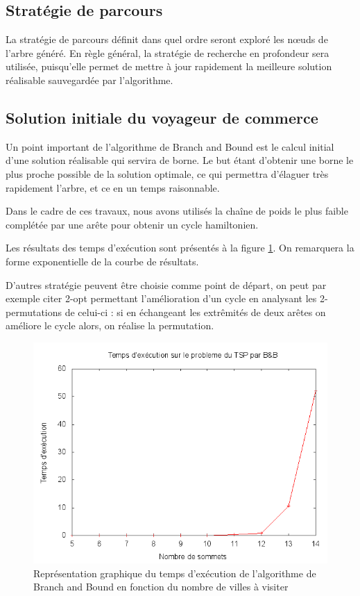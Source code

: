 \subsection{Stratégie de parcours}
La stratégie de parcours définit dans quel ordre seront exploré les n\oe uds de l'arbre généré. En
règle général, la stratégie de recherche en profondeur sera utilisée, puisqu'elle permet de mettre à
jour rapidement la meilleure solution réalisable sauvegardée par l'algorithme.


\subsection{Solution initiale du voyageur de commerce}

Un point important de l'algorithme de Branch and Bound est le calcul initial d'une solution
réalisable qui servira de borne. Le but étant d'obtenir une borne le plus proche possible de la
solution optimale, ce qui permettra d'élaguer très rapidement l'arbre, et ce en un temps
raisonnable.

Dans le cadre de ces travaux, nous avons utilisés la chaîne de poids le plus faible complétée par
une arête pour obtenir un cycle hamiltonien. 

Les résultats des temps d'exécution sont présentés à la figure \ref{tsp_chaine}. On remarquera la forme
exponentielle de la courbe de résultats.

D'autres stratégie peuvent être choisie comme point de départ, on peut par exemple citer 2-opt
permettant l'amélioration d'un cycle en analysant les 2-permutations de celui-ci : si en échangeant
les extrêmités de deux arêtes on améliore le cycle alors, on réalise la permutation.

\begin{figure}[H]
	\begin{center}
	\includegraphics[width=\linewidth]{../pratique/branch_and_bound_dev/tsp_bb.png}
\end{center}
\caption{Représentation graphique du temps d'exécution de l'algorithme de Branch and Bound en
fonction du nombre de villes à visiter}
\label{tsp_chaine}
\end{figure}

